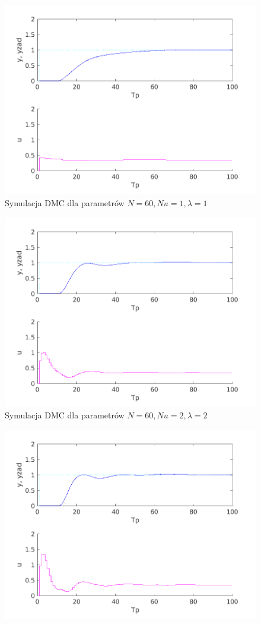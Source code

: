 \documentclass[a4paper, 10pt]{article}
\begin{document}
	\begin{figure}
		\centering
		\includegraphics[width=0.7\linewidth]{z5_60_60_1_1.png}
		\caption{Symulacja DMC dla parametrów $N=60, Nu = 1, \lambda = 1$}
		\label{fig:z5_60_60_1_1}
	\end{figure}\begin{figure}
	\centering
	\includegraphics[width=0.7\linewidth]{z5_60_60_2_1.png}
	\caption{Symulacja DMC dla parametrów $N=60, Nu = 2, \lambda = 2$}
	\label{fig:z5_60_60_2_1}
\end{figure}\begin{figure}
\centering
\includegraphics[width=0.7\linewidth]{z5_60_60_3_1.png}

\end{figure}
\end{document}
